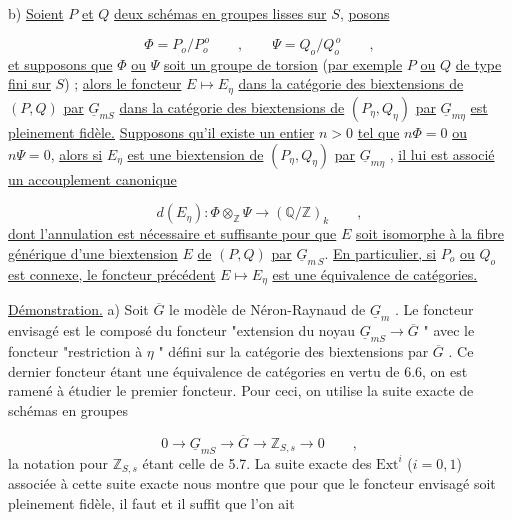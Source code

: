
b)  \underline{Soient} $P$ \underline{et} $Q$ \underline{deux schémas en groupes lisses sur} $S$, \underline{posons}

\begin{equation*}
\Phi = P_o/P_o^{\,o} \qquad , \qquad \Psi = Q_o/Q_o^{\,o} \qquad ,
\end{equation*}
\underline{et supposons que} $\Phi$ \underline{ou} $\Psi$ \underline{soit un groupe de torsion} (\underline{par exemple} $P$ \underline{ou} $Q$ \underline{de type fini sur} $S$) ; \underline{alors le foncteur} $E \longmapsto E_\eta$ \underline{dans la catégorie des biextensions de} $(P,Q)$ \underline{par} $\underline{G}_{mS}$ \underline{dans la catégorie des biextensions de} $(P_\eta,Q_\eta)$ \underline{par} $\underline{G}_{m\eta}$ \underline{est pleinement fidèle.} \underline{Supposons qu'il existe un entier} $n > 0$ \underline{tel que} $n\Phi=0$ \underline{ou} $n\Psi=0$, \underline{alors si} $E_\eta$ \underline{est une biextension de} $(P_\eta,Q_\eta)$ \underline{par} $\underline{G}_{m\eta}$ , \underline{il lui est associé un accouplement canonique}

\begin{equation}\tag{7.1.2}
d(E_\eta) : \Phi \otimes_{\mathbb{Z}} \Psi \longrightarrow (\mathbb{Q}/\mathbb{Z})_k \qquad ,
\end{equation}
\underline{dont l'annulation est nécessaire et suffisante pour que} $E$ \underline{soit isomorphe à la fibre générique d'une biextension} $E$ \underline{de} $(P,Q)$ \underline{par} $\underline{G}_{m\,S}$. \underline{En particulier, si} $P_o$ \underline{ou} $Q_o$ \underline{est connexe, le foncteur précédent} $E \longmapsto E_\eta$ \underline{est une équivalence de catégories.}

\underline{Démonstration.}  a)  Soit $\overline{G}$ le modèle de Néron-Raynaud de $\underline{G}_m$ . Le foncteur envisagé est le composé du foncteur "extension du noyau $\underline{G}_{mS} \longrightarrow \overline{G}$ " avec le foncteur "restriction à $\eta$ " défini sur la catégorie des biextensions par $\overline{G}$ . Ce dernier foncteur étant une équivalence de catégories en vertu de 6.6, on est ramené à étudier le premier foncteur. Pour ceci, on utilise la suite exacte de schémas en groupes

\begin{equation}\tag{7.1.3}
0 \longrightarrow \underline{G}_{mS} \longrightarrow \overline{G} \longrightarrow \mathbb{Z}_{S,s} \longrightarrow 0 \qquad ,
\end{equation}
la notation pour $\mathbb{Z}_{S,s}$ étant celle de 5.7. La suite exacte des $\mathrm{Ext}^i$ ($i=0,1$) associée à cette suite exacte nous montre que pour que le foncteur envisagé soit pleinement fidèle, il faut et il suffit que l'on ait 


